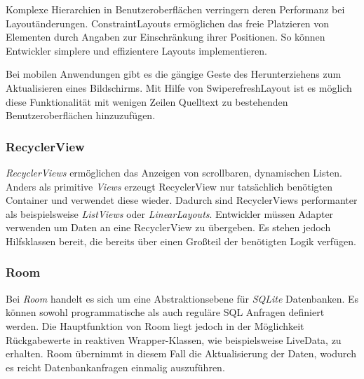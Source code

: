 \documentclass[a4paper, 11pt]{article}
\begin{document}
Komplexe Hierarchien in Benutzeroberflächen verringern deren Performanz bei Layoutänderungen.
ConstraintLayouts ermöglichen das freie Platzieren von Elementen durch Angaben zur Einschränkung ihrer Positionen.
So können Entwickler simplere und effizientere Layouts implementieren.

Bei mobilen Anwendungen gibt es die gängige Geste des Herunterziehens zum Aktualisieren eines Bildschirms.
Mit Hilfe von SwiperefreshLayout ist es möglich diese Funktionalität mit wenigen Zeilen Quelltext zu bestehenden Benutzeroberflächen hinzuzufügen.

\subsubsection{RecyclerView}
\label{subsubsec:app:jetpack:recyclerview}
\textit{RecyclerViews} ermöglichen das Anzeigen von scrollbaren, dynamischen Listen.
Anders als primitive \textit{Views} erzeugt RecyclerView nur tatsächlich benötigten Container und verwendet diese wieder.
Dadurch sind RecyclerViews performanter als beispielsweise \textit{ListViews} oder \textit{LinearLayouts}.
Entwickler müssen Adapter verwenden um Daten an eine RecyclerView zu übergeben.
Es stehen jedoch Hilfsklassen bereit, die bereits über einen Großteil der benötigten Logik verfügen.

\subsubsection{Room}
\label{subsubsec:app:jetpack:room}
Bei \textit{Room} handelt es sich um eine Abstraktionsebene für \textit{SQLite} Datenbanken.
Es können sowohl programmatische als auch reguläre SQL Anfragen definiert werden.
Die Hauptfunktion von Room liegt jedoch in der Möglichkeit Rückgabewerte in reaktiven Wrapper-Klassen, wie beispielsweise LiveData, zu erhalten.
Room übernimmt in diesem Fall die Aktualisierung der Daten, wodurch es reicht Datenbankanfragen einmalig auszuführen.
\end{document}
